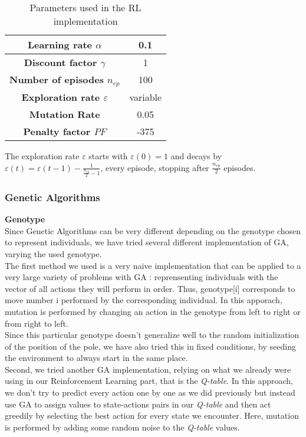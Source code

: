 \begin{table}[htb]%
	\centering
	\caption{Parameters used in the RL implementation}
	\label{tab:RL_parameters}
	\begin{tabular}{|S|S|} 		%
		
		\hline
		{\textbf{Learning rate $\alpha$}} &  {0.1} \\
		\hline
		{\textbf{Discount factor $\gamma$}} & {1} \\
		\hline
		{\textbf{Number of episodes $n_{ep}$}} & {100} \\
		\hline
		{\textbf{Exploration rate $\varepsilon$}}  & {variable} \\
		\hline
		{\textbf{Mutation Rate}} & {0.05} \\
		\hline
		{\textbf{Penalty factor $PF$}}& {-375} \\
		\hline
		
	\end{tabular}
\end{table}
The exploration rate $\varepsilon$ starts with $\varepsilon(0)=1$ and decays by $\varepsilon(t) = \varepsilon(t - 1) - \frac{1}{\frac{n_{ep}}{2} - 1}$, every episode, stopping after $\frac{n_{ep}}{2}$ episodes.


\subsubsection{Genetic Algorithms}

\textbf{Genotype}\\
Since Genetic Algorithms can be very different depending on the genotype chosen to represent individuals, we have tried several different implementation of GA, varying the used genotype.
\\
The first method we used is a very naive implementation that can be applied to a very large variety of problems with GA : reprensenting individuals with the vector of all actions they will perform in order.
Thus, genotype[i] corresponds to move number i performed by the corresponding individual.
In this apporach, mutation is performed by changing an action in the genotype from left to right or from right to left.
\\
Since this particular genotype doesn't generalize well to the random initialization of the position of the pole, we have also tried this in fixed conditions, by seeding the environment to always start in the same place.
\\
Second, we tried another GA implementation, relying on what we already were using in our Reinforcement Learning part, that is the \textit{Q-table}.
In this approach, we don't try to predict every action one by one as we did previously but instead use GA to assign values to state-actions pairs in our \textit{Q-table} and then act greedily by selecting the best action for every state we encounter.
Here, mutation is performed by adding some random noise to the \textit{Q-table} values.
\\

